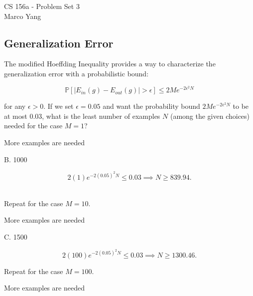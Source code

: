 \documentclass[answers]{exam}
\begin{document}
\begin{center}
{\Large CS 156a - Problem Set 3} \\
\medskip
Marco Yang \\
\bigskip
\end{center}

\begin{questions}

\section*{Generalization Error}

\question
The modified Hoeffding Inequality provides a way to characterize the 
generalization error with a probabilistic bound:

\[
\mathbb{P}\left[ |E_{in}(g) - E_{out}(g)| > \epsilon \right] \leq 2M 
e^{-2\epsilon^2 N}
\]

for any $\epsilon > 0$. If we set $\epsilon = 0.05$ and want the 
probability bound $2M e^{-2\epsilon^2 N}$ to be at most 0.03, what is 
the least number of examples $N$ (among the given choices) needed for 
the case $M = 1$?

\begin{choices}
    \choice More examples are needed
\end{choices}

\begin{solution}
B. 1000

\[
2(1)e^{-2(0.05)^2N} \le 0.03 \implies N \ge 839.94
.\]  
\end{solution}

\question
Repeat for the case $M = 10$.

\begin{choices}
    \choice More examples are needed
\end{choices}

\begin{solution}
C. 1500

\[
2(100)e^{-2(0.05)^2N} \le 0.03 \implies N \ge 1300.46
.\] 
\end{solution}

\question
Repeat for the case $M = 100$.

\begin{choices}
    \choice More examples are needed
\end{choices}


\end{questions}
\end{document}
